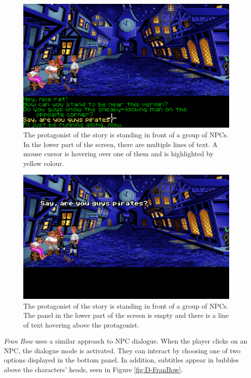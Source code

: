 \begin{figure}[H]
\centering
\includegraphics[width=.8\linewidth]{img/D-TSoMI1.png}
\caption{The protagonist of the story is standing in front of a group of NPCs. In the lower part of the screen, there are multiple lines of text. A mouse cursor is hovering over one of them and is highlighted by yellow colour.}
\label{fig:D-TSoMI1}
\end{figure}

\begin{figure}[H]
\centering
\includegraphics[width=.8\linewidth]{img/D-TSoMI2.png}
\caption{The protagonist of the story is standing in front of a group of NPCs. The panel in the lower part of the screen is empty and there is a line of text hovering above the protagonist.}
\label{fig:D-TSoMI2}
\end{figure}

\textit{Fran Bow} uses a similar approach to NPC dialogue. When the player clicks on an NPC, the dialogue mode is activated. They can interact by choosing one of two options displayed in the bottom panel. In addition, subtitles appear in bubbles above the characters' heads, seen in Figure \ref{fig:D-FranBow}. 

